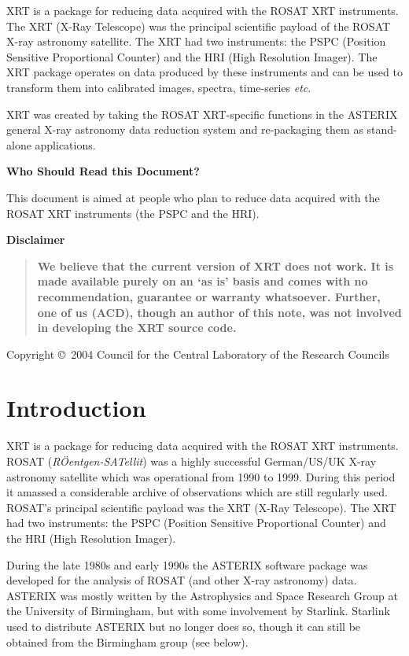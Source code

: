 \documentclass[twoside,11pt]{article}
\newcommand{\stardocinitials}  {SUN}
\newcommand{\stardoccopyright} 
{Copyright \copyright\ 2004 Council for the Central Laboratory of the 
Research Councils}
\newcommand{\stardocnumber}    {247.1}
\newcommand{\stardocabstract}  {
XRT is a package for reducing data acquired with the ROSAT XRT
instruments.  The XRT (X-Ray Telescope) was the principal scientific
payload of the ROSAT X-ray astronomy satellite.  The XRT had two
instruments: the PSPC (Position Sensitive Proportional Counter) and the
HRI (High Resolution Imager).  The XRT package operates on data produced
by these instruments and can be used to transform them into calibrated
images, spectra, time-series \emph{etc}.

XRT was created by taking the ROSAT XRT-specific functions in the ASTERIX
general X-ray astronomy data reduction system and re-packaging them as
stand-alone applications.

\begin{latexonly}
\vspace{2mm}
\end{latexonly}

\begin{center}
{\bf Who Should Read this Document?}
\end{center}

This document is aimed at people who plan to reduce data acquired with
the ROSAT XRT instruments (the PSPC and the HRI).

\begin{latexonly}
\vspace{2mm}
\end{latexonly}

\begin{center}
{\bf Disclaimer}
\end{center}

\begin{quote}
{\bf We believe that the current version of XRT does not work.  It is
made available purely on an `as is' basis and comes with no
recommendation, guarantee or warranty whatsoever.  Further, one of us
(ACD), though an author of this note, was not involved in developing the
XRT source code.}
\end{quote}}
\newcommand{\stardocname}{\stardocinitials /\stardocnumber}
\newcommand{\htmladdnormallink}[2]{#1}
\newenvironment{latexonly}{}{}
\newcommand{\xlabel}[1]{}
\renewcommand{\_}{\texttt{\symbol{95}}}
\renewcommand{\thepage}{\roman{page}}
\begin{document}
\stardocabstract

\begin{latexonly}
\vspace*{\fill}
\stardoccopyright
\end{latexonly}


\newpage
\renewcommand{\thepage}{\arabic{page}}
\setcounter{page}{1}

\section{\xlabel{INTRO}\label{INTRO}Introduction}

XRT is a package for reducing data acquired with the ROSAT XRT instruments.
\htmladdnormallink{ROSAT}{http://ledas-www.star.le.ac.uk/rosat-goc/index.html}
({\it R\"{O}entgen-SATellit}\/) was a highly successful German/US/UK
X-ray astronomy satellite which was operational from 1990 to 1999.
During this period it amassed a considerable archive of observations which
are still regularly used.  ROSAT's principal scientific payload was the
XRT (X-Ray Telescope).  The XRT had two instruments: the PSPC (Position
Sensitive Proportional Counter) and the HRI (High Resolution Imager).

During the late 1980s and early 1990s the 
\htmladdnormallink{ASTERIX}{http://www.sr.bham.ac.uk/asterix/}
software package was developed for the analysis of ROSAT (and other X-ray
astronomy) data.  ASTERIX was mostly written by the 
\htmladdnormallink{Astrophysics and Space Research Group}
{http://www.sr.bham.ac.uk/}
at the University of Birmingham, but with some involvement by Starlink.
Starlink used to distribute ASTERIX but no longer does so, though it
can still be obtained from the Birmingham group (see below).
\end{document}
